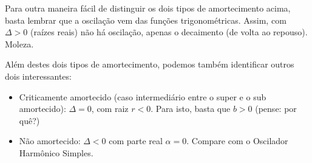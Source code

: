 \documentclass[a4paper]{article}
\begin{document}
Para outra maneira fácil de distinguir os dois tipos de amortecimento
acima, basta lembrar que a oscilação vem das funções
trigonométricas. Assim, com $\Delta>0$ (raízes reais) não há
oscilação, apenas o decaimento (de volta ao repouso). Moleza.

Além destes dois tipos de amortecimento, podemos também identificar
outros dois interessantes:

\begin{itemize}
\item Criticamente amortecido (caso intermediário entre o super e o
  sub amortecido): $\Delta=0$, com raiz $r<0$. Para isto, basta que
  $b>0$ (pense: por quê?)
\item Não amortecido: $\Delta<0$ com parte real $\alpha=0$. Compare
  com o Oscilador Harmônico Simples.
\end{itemize}
\end{document}

